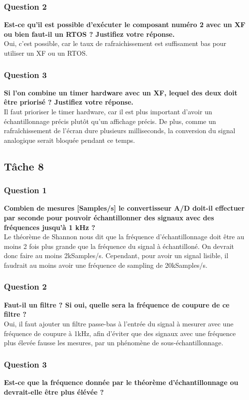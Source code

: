 \documentclass[12pt]{article}
\begin{document}
	\subsubsection{Question 2}
	\textbf{Est-ce qu'il est possible d'exécuter le composant numéro 2 avec un XF ou bien faut-il un RTOS ? Justifiez votre réponse.}\\
	Oui, c'est possible, car le taux de rafraichissement est suffisament bas pour utiliser un XF ou un RTOS.
	\subsubsection{Question 3}
	\textbf{Si l'on combine un timer hardware avec un XF, lequel des deux doit être priorisé ? Justifiez votre réponse.}\\
	Il faut prioriser le timer hardware, car il est plus important d'avoir un échantillonnage précis plutôt qu'un affichage précis. De plus, comme un rafraîchissement de l'écran dure plusieurs milliseconds, la conversion du signal analogique serait bloquée pendant ce temps.
	
	\subsection{Tâche 8}
	\subsubsection{Question 1}
	\textbf{Combien de mesures [Samples/s] le convertisseur A/D doit-il effectuer par seconde pour pouvoir échantillonner des signaux avec des fréquences jusqu'à 1 kHz ?}\\
	Le théorème de Shannon nous dit que la fréquence d'échantillonnage doit être au moins 2 fois plus grande que la fréquence du signal à échantilloné. On devrait donc faire au moins 2kSamples/s. Cependant, pour avoir un signal lisible, il faudrait au moins avoir une fréquence de sampling de 20kSamples/s.
	\subsubsection{Question 2}
	\textbf{Faut-il un filtre ? Si oui, quelle sera la fréquence de coupure de ce filtre ?}\\
	Oui, il faut ajouter un filtre passe-bas à l'entrée du signal à mesurer avec une fréquence de coupure à 1kHz, afin d'éviter que des signaux avec une fréquence plus élevée fausse les mesures, par un phénomène de sous-échantillonnage.
	\subsubsection{Question 3}
	\textbf{Est-ce que la fréquence donnée par le théorème d’échantillonnage ou devrait-elle être plus élévée ?}\\	
\end{document}
